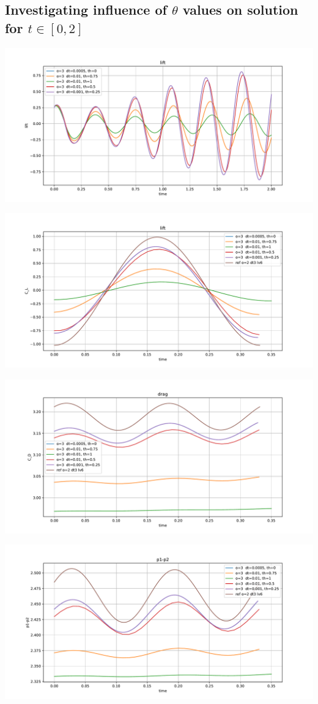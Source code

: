 \documentclass[11pt]{article}
\begin{document}
\subsection{Investigating influence of $\theta$ values on solution for $t\in[0,2]$}

\includegraphics[width=0.75\columnwidth]{lift_full_theta}

\includegraphics[width=0.75\columnwidth]{lift_theta}

\includegraphics[width=0.75\columnwidth]{drag_theta}

\includegraphics[width=0.75\columnwidth]{p1p2_theta}
\end{document}

